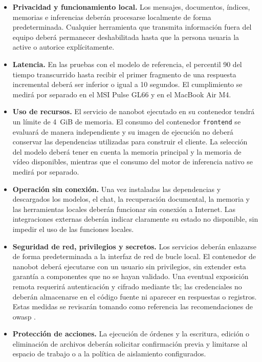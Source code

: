 \begin{itemize}
    \item[\textbf{RNF1.}] \textbf{Privacidad y funcionamiento local.} Los mensajes, documentos, índices, memorias e inferencias deberán procesarse localmente de forma predeterminada. Cualquier herramienta que transmita información fuera del equipo deberá permanecer deshabilitada hasta que la persona usuaria la active o autorice explícitamente.
    \item[\textbf{RNF2.}] \textbf{Latencia.} En las pruebas con el modelo de referencia, el percentil 90 del tiempo transcurrido hasta recibir el primer fragmento de una respuesta incremental deberá ser inferior o igual a 10 segundos. El cumplimiento se medirá por separado en el MSI Pulse GL66 y en el MacBook Air M4.
    \item[\textbf{RNF3.}] \textbf{Uso de recursos.} El servicio de \gls{nanobot} ejecutado en su contenedor tendrá un límite de 4~GiB de memoria. El consumo del contenedor \texttt{frontend} se evaluará de manera independiente y su imagen de ejecución no deberá conservar las dependencias utilizadas para construir el cliente. La selección del modelo deberá tener en cuenta la memoria principal y la memoria de vídeo disponibles, mientras que el consumo del motor de inferencia nativo se medirá por separado.
    \item[\textbf{RNF4.}] \textbf{Operación sin conexión.} Una vez instaladas las dependencias y descargados los modelos, el chat, la recuperación documental, la memoria y las herramientas locales deberán funcionar sin conexión a Internet. Las integraciones externas deberán indicar claramente su estado no disponible, sin impedir el uso de las funciones locales.
    \item[\textbf{RNF5.}] \textbf{Seguridad de red, privilegios y secretos.} Los servicios deberán enlazarse de forma predeterminada a la interfaz de red de bucle local. El contenedor de \gls{nanobot} deberá ejecutarse con un usuario sin privilegios, sin extender esta garantía a componentes que no se hayan validado. Una eventual exposición remota requerirá autenticación y cifrado mediante \gls{tls}; las credenciales no deberán almacenarse en el código fuente ni aparecer en respuestas o registros. Estas medidas se revisarán tomando como referencia las recomendaciones de \gls{owasp} \cite{OWASPTopTen}.
    \item[\textbf{RNF6.}] \textbf{Protección de acciones.} La ejecución de órdenes y la escritura, edición o eliminación de archivos deberán solicitar confirmación previa y limitarse al espacio de trabajo o a la política de aislamiento configurados.

\end{itemize}
